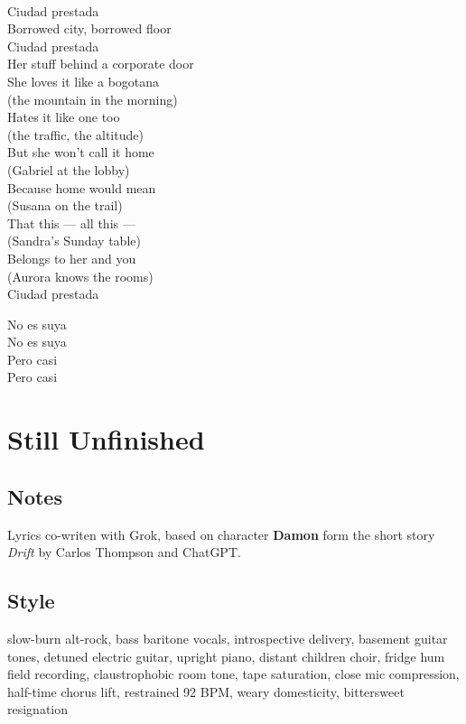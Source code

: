 \begin{lyrics}
\\
Ciudad prestada\\
Borrowed city, borrowed floor\\
Ciudad prestada\\
Her stuff behind a corporate door\\
She loves it like a bogotana\\
(the mountain in the morning)\\
Hates it like one too\\
(the traffic, the altitude)\\
But she won't call it home\\
(Gabriel at the lobby)\\
Because home would mean\\
(Susana on the trail)\\
That this — all this —\\
(Sandra's Sunday table)\\
Belongs to her and you\\
(Aurora knows the rooms)\\
Ciudad prestada

No es suya\\
No es suya\\
Pero casi\\
Pero casi
\end{lyrics}

\section{Still Unfinished}

\subsection{Notes}
Lyrics co-writen with Grok, based on character \textbf{Damon} form the short story \emph{Drift} by Carlos Thompson and ChatGPT.

\subsection{Style}
slow-burn alt-rock, bass baritone vocals, introspective delivery, basement guitar tones, detuned electric guitar, upright piano, distant children choir, fridge hum field recording, claustrophobic room tone, tape saturation, close mic compression, half-time chorus lift, restrained 92 BPM, weary domesticity, bittersweet resignation

